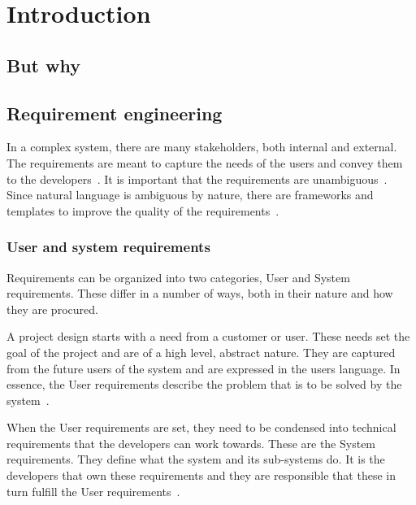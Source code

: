 \chapter{Introduction}
\section{But why}
\section{Requirement engineering}
In a complex system, there are many stakeholders, both internal and external.
The requirements are meant to capture the needs of the users and convey them to
the developers~\cite{ibm_req}. It is important that the requirements are
unambiguous~\cite{ibm_req, rupp2014}. Since natural language is ambiguous by
nature, there are frameworks and templates to improve the quality of the
requirements~\cite{rupp2014}. 

\subsection{User and system requirements}
Requirements can be organized into two categories, User and System requirements.
These differ in a number of ways, both in their nature and how they are
procured.

A project design starts with a need from a customer or user. These needs set the
goal of the project and are of a high level, abstract nature. They are captured
from the future users of the system and are expressed in the users language. In
essence, the User requirements describe the problem that is to be solved by the
system~\cite{ibm_req}. 

When the User requirements are set, they need to be condensed into technical
requirements that the developers can work towards. These are the System
requirements. They define what the system and its sub-systems do. It is the
developers that own these requirements and they are responsible that these in
turn fulfill the User requirements~\cite{ibm_req}.

